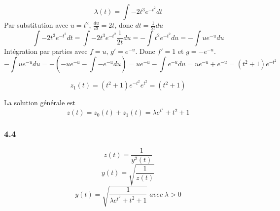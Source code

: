 \documentclass[]{book}
\theoremstyle{definition}
\begin{document}
$$\lambda(t) = \int{-2t^3e^{-t^2}dt}$$
Par substitution avec $u = t^2$, $\frac{du}{dt} = 2t$, donc $dt=\frac{1}{2t}du$
$$\int{-2t^3e^{-t^2}dt} = \int{-2t^3e^{-t^2}\frac{1}{2t}du} = -\int{t^2e^{-t^2}du} = -\int{ue^{-u} du}$$
Int\'egration par parties avec $f=u$, $g'=e^{-u}$. Donc $f'=1$ et $g=-e^{-u}$.
$$-\int{ue^{-u} du} = -(-ue^{-u} - \int{-e^{-u}du}) = ue^{-u} - \int{e^{-u}du} = ue^{-u} + e^{-u} = (t^2+1)e^{-t^2}$$

$$z_1(t) = (t^2+1)e^{-t^2}e^{t^2} = (t^2+1)$$

La solution g\'en\'erale est
$$z(t) = z_0(t) + z_1(t) = \lambda e^{t^2} + t^2 + 1$$

\subsubsection*{4.4}
$$z(t) = \frac{1}{y^2(t)}$$
$$y(t) = \sqrt{\frac{1}{z(t)}}$$
$$y(t) = \sqrt{\frac{1}{\lambda e^{t^2} + t^2 + 1}}\; avec\; \lambda > 0$$
\end{document}
